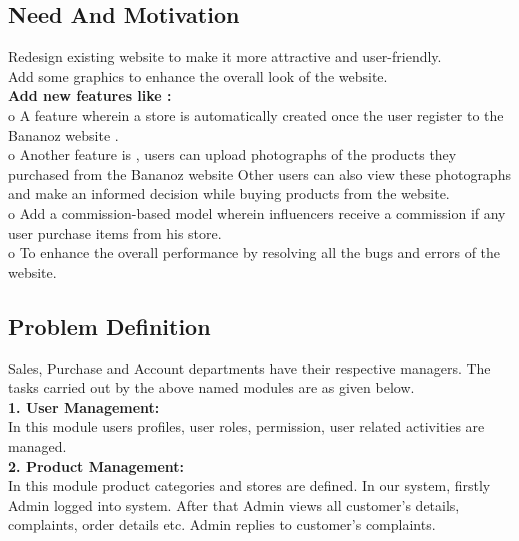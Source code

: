 \subsection{Need And Motivation}


\textbullet \hspace{0.2cm} Redesign existing website to make it more attractive and user-friendly.\\
\textbullet \hspace{0.2cm} Add some graphics to enhance the overall look of the website.\\
\textbullet \hspace{0.2cm}	\textbf{Add new features like :}\\
o	A feature wherein a store is automatically created once the user register to the Bananoz website .\\
o	Another feature  is , users can upload photographs of the products they purchased from the Bananoz website Other users can also view these photographs and make an informed decision while buying products from the website.\\
o	Add a commission-based model wherein influencers receive a commission if any user purchase items from his store.\\
o	To enhance the overall performance by resolving all the bugs and errors of the website.\\



\subsection{Problem Definition }
  Sales, Purchase and Account departments have their respective managers. The tasks carried out by the above named modules are as given below.\\
\textbf{1. User Management:}\\
In this module users profiles, user roles, permission, user related activities are managed. \\
 \textbf{2. Product Management:}\\
In this module product categories and stores are defined. In our system, firstly Admin logged into system. After that Admin views all customer’s details, complaints, order details etc. Admin replies to customer’s complaints.\\

